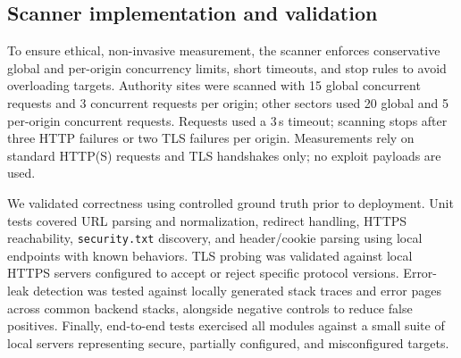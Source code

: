 \documentclass[conference]{IEEEtran}
\begin{document}
\subsection{Scanner implementation and validation}
To ensure ethical, non-invasive measurement, the scanner enforces conservative global and per-origin concurrency limits, short timeouts, and stop rules to avoid overloading targets. Authority sites were scanned with 15 global concurrent requests and 3 concurrent requests per origin; other sectors used 20 global and 5 per-origin concurrent requests. Requests used a 3\,s timeout; scanning stops after three HTTP failures or two TLS failures per origin. Measurements rely on standard HTTP(S) requests and TLS handshakes only; no exploit payloads are used.

We validated correctness using controlled ground truth prior to deployment. Unit tests covered URL parsing and normalization, redirect handling, HTTPS reachability, \texttt{security.txt} discovery, and header/cookie parsing using local endpoints with known behaviors. TLS probing was validated against local HTTPS servers configured to accept or reject specific protocol versions. Error-leak detection was tested against locally generated stack traces and error pages across common backend stacks, alongside negative controls to reduce false positives. Finally, end-to-end tests exercised all modules against a small suite of local servers representing secure, partially configured, and misconfigured targets.
\end{document}
